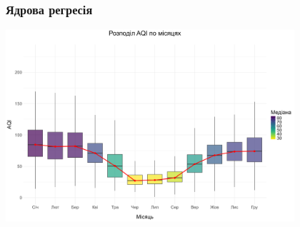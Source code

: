 \documentclass{beamer}
\begin{document}
\begin{frame}
  \frametitle{Ядрова регресія}

  \begin{center}
    \includegraphics[height=2.8in]{plots/lab4/kernal/seasonal_change_median_line.png}
  \end{center}

\end{frame}
\end{document}
